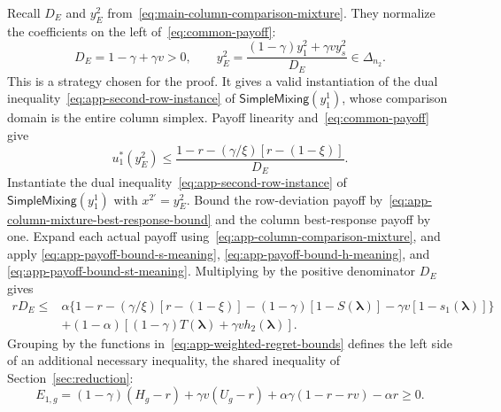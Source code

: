 \documentclass[11pt]{article}
\theoremstyle{remark}
\theoremstyle{plain}
\newcommand{\sm}{\mathsf{SimpleMixing}}
\begin{document}
Recall $D_E$ and $y_E^2$ from~\eqref{eq:main-column-comparison-mixture}.
They normalize the coefficients on the left of~\eqref{eq:common-payoff}:
\begin{equation}
 D_E=1-\gamma+\gamma v>0,\qquad
 y_E^2=\frac{(1-\gamma)y_1^2+\gamma v y_s^2}{D_E}\in\Delta_{n_2}.
 \label{eq:app-column-comparison-mixture}
\end{equation}
This is a strategy chosen for the proof. It gives a valid instantiation
of the dual inequality~\eqref{eq:app-second-row-instance} of
$\sm(y_1^1)$, whose comparison domain is the entire column simplex. Payoff linearity and~\eqref{eq:common-payoff}
give
\begin{equation}
 u_1^*(y_E^2)\le
 \frac{1-r-(\gamma/\xi)[r-(1-\xi)]}{D_E}.
 \label{eq:app-column-mixture-best-response-bound}
\end{equation}
Instantiate the dual inequality~\eqref{eq:app-second-row-instance}
of $\sm(y_1^1)$ with $x^{2\prime}=y_E^2$. Bound the row-deviation
payoff by~\eqref{eq:app-column-mixture-best-response-bound} and the
column best-response payoff by one. Expand each actual payoff
using~\eqref{eq:app-column-comparison-mixture}, and apply
\eqref{eq:app-payoff-bound-s-meaning},
\eqref{eq:app-payoff-bound-h-meaning}, and
\eqref{eq:app-payoff-bound-st-meaning}.
Multiplying by the positive denominator $D_E$ gives
\begin{equation}
 \begin{aligned}
 rD_E\le{}&
 \alpha\{1-r-(\gamma/\xi)[r-(1-\xi)]
       -(1-\gamma)[1-S(\boldsymbol\lambda)]-\gamma v[1-s_1(\boldsymbol\lambda)]\}\\
 &+(1-\alpha)[(1-\gamma)T(\boldsymbol\lambda)+\gamma v h_2(\boldsymbol\lambda)].
 \end{aligned}
 \label{eq:app-column-mixture-second-row-test}
\end{equation}
Grouping by the functions in~\eqref{eq:app-weighted-regret-bounds}
defines the left side of an additional necessary inequality, the
shared inequality of Section~\ref{sec:reduction}:
\begin{equation}
 E_{1,g}=(1-\gamma)(H_g-r)+\gamma v(U_g-r)
               +\alpha\gamma(1-r-rv)-\alpha r\ge0.
 \label{eq:common-envelope}
\end{equation}
\end{document}
